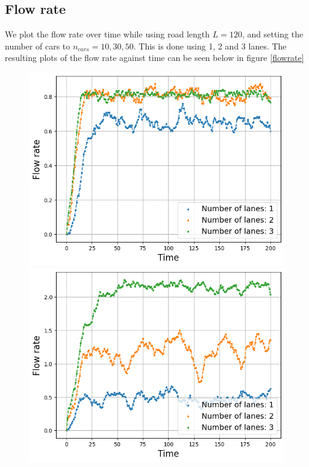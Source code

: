 \documentclass[a4paper,12pt]{article}
\begin{document}
\subsection*{Flow rate}
We plot the flow rate over time while using road length $L=120$, and setting the number of cars to $n_{cars}=10, 30, 50$. This is done using 1, 2 and 3 lanes.
The resulting plots of the flow rate against time can be seen below in figure \ref*{flowrate}
\begin{figure}[H]
    \centering
    \begin{minipage}{.5\textwidth}
        \centering
        \includegraphics[scale=0.47]{Images/flowrate time 10 cars.png}
    \end{minipage}%
    \begin{minipage}{.5\textwidth}
        \centering
        \includegraphics[scale=0.47]{Images/flowrate time 30 cars.png}

\end{minipage}
\end{figure}
\end{document}
